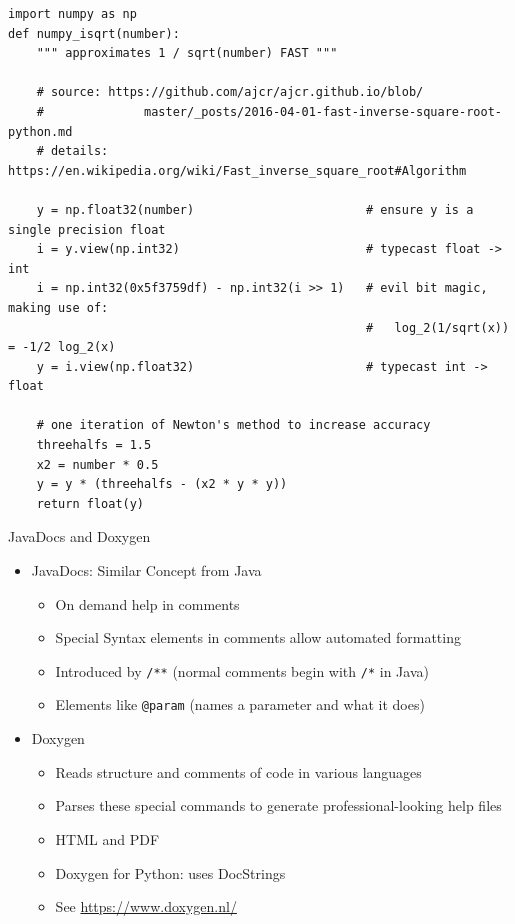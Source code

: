 
\begin{frame}[fragile]
%
\begin{codebox}
\begin{verbatim}
import numpy as np
def numpy_isqrt(number):
    """ approximates 1 / sqrt(number) FAST """
    
    # source: https://github.com/ajcr/ajcr.github.io/blob/
    #              master/_posts/2016-04-01-fast-inverse-square-root-python.md
    # details: https://en.wikipedia.org/wiki/Fast_inverse_square_root#Algorithm
    
    y = np.float32(number)                        # ensure y is a single precision float    
    i = y.view(np.int32)                          # typecast float -> int
    i = np.int32(0x5f3759df) - np.int32(i >> 1)   # evil bit magic, making use of:
                                                  #   log_2(1/sqrt(x)) = -1/2 log_2(x)
    y = i.view(np.float32)                        # typecast int -> float
    
    # one iteration of Newton's method to increase accuracy
    threehalfs = 1.5
    x2 = number * 0.5
    y = y * (threehalfs - (x2 * y * y))
    return float(y)
\end{verbatim}
\end{codebox}
%
\end{frame}


\begin{frame}{JavaDocs and Doxygen}
%
\begin{itemize}
\item JavaDocs: Similar Concept from Java
	\begin{itemize}
	\item On demand help in comments
	\item Special Syntax elements in comments allow automated formatting
	\item Introduced by \texttt{/**} (normal comments begin with \texttt{/*} in Java)
	\item Elements like \texttt{@param} (names a parameter and what it does)
	\end{itemize}
	\pause
\item Doxygen
	\begin{itemize}
	\item Reads structure and comments of code in various languages
	\item Parses these special commands to generate professional-looking help files
	\item HTML and PDF
	\item Doxygen for Python: uses DocStrings
	\item See \url{https://www.doxygen.nl/}
	\end{itemize}
\end{itemize}
%
\end{frame}

